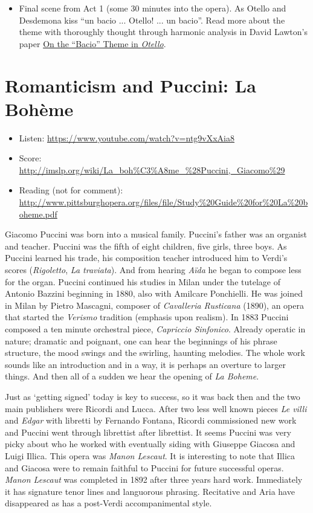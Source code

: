 \begin{itemize}
\item Final scene from Act 1 (some 30 minutes into the opera). As Otello and Desdemona kiss ``un bacio ... Otello! ... un bacio''. Read more about the theme with thoroughly thought through harmonic analysis in David Lawton's paper \href{http://www.jstor.org/stable/746411?seq=1#page_scan_tab_contents}{On the ``Bacio'' Theme in \textit{Otello}}. 
\end{itemize}

\section{Romanticism and Puccini: La Boh\`eme}
\begin{itemize}
\item Listen: \url{https://www.youtube.com/watch?v=ntg9vXxAia8}
\item Score: \url{http://imslp.org/wiki/La_boh%C3%A8me_%28Puccini,_Giacomo%29}
\item Reading (not for comment): \url{http://www.pittsburghopera.org/files/file/Study%20Guide%20for%20La%20boheme.pdf}
\end{itemize}

Giacomo Puccini was born into a musical family. Puccini's father was an organist and teacher. Puccini was the fifth of eight children, five girls, three boys. As Puccini learned his trade, his composition teacher introduced him to Verdi's scores (\textit{Rigoletto}, \textit{La traviata}). And from hearing \textit{A\"ida} he began to compose less for the organ. Puccini continued his studies in Milan under the tutelage of Antonio Bazzini beginning in 1880, also with Amilcare Ponchielli. He was joined in Milan by Pietro Mascagni, composer of \textit{Cavalleria Rusticana} (1890), an opera that started the \textit{Verismo} tradition (emphasis upon realism). In 1883 Puccini composed a ten minute orchestral piece, \textit{Capriccio Sinfonico}. Already operatic in nature; dramatic and poignant, one  can hear the beginnings of his phrase structure, the mood swings and the swirling, haunting melodies. The whole work sounds like an introduction and in a way, it is perhaps an overture to larger things. And then all of a sudden we hear the opening of \textit{La Boheme}. 

Just as `getting signed' today is key to success, so it was back then and the two main publishers were Ricordi and Lucca. After two less well known pieces \textit{Le villi} and \textit{Edgar} with libretti by Fernando Fontana, Ricordi commissioned new work and Puccini went through librettist after librettist. It seems Puccini was very picky about who he worked with eventually siding with Giuseppe Giacosa and Luigi Illica. This opera was \textit{Manon Lescaut}. It is interesting to note that Illica and Giacosa were to remain faithful to Puccini for future successful operas. \textit{Manon Lescaut} was completed in 1892 after three years hard work. Immediately it has signature tenor lines and languorous phrasing. Recitative and Aria have disappeared as has a post-Verdi accompanimental style. 

